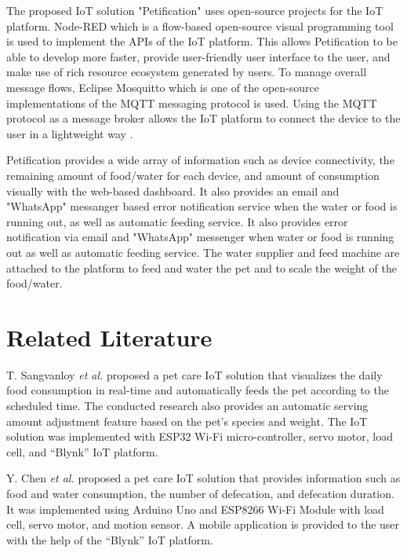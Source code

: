﻿\documentclass[conference]{IEEEtran}
\begin{document}
The proposed IoT solution "Petification" uses open-source projects for the IoT platform.
Node-RED which is a flow-based open-source visual programming tool \cite{b7} is used to implement the APIs of the IoT platform.
This allows Petification to be able to develop more faster, provide user-friendly user interface to the user, and make use of rich resource ecosystem generated by users. 
To manage overall message flows, Eclipse Mosquitto which is one of the open-source implementations of the MQTT messaging protocol is used.
Using the MQTT protocol as a message broker allows the IoT platform to connect the device to the user in a lightweight way \cite{b8}.

Petification provides a wide array of information such as device connectivity, the remaining amount of food/water for each device, and amount of consumption visually with the web-based dashboard.
It also provides an email and "WhatsApp" messanger based error notification service when the water or food is running out, as well as automatic feeding service.
It also provides error notification via email and "WhatsApp" messenger when water or food is running out as well as automatic feeding service.
The water supplier and feed machine are attached to the platform to feed and water the pet and to scale the weight of the food/water.

\section{Related Literature}
T. Sangvanloy \textit{et al.} \cite{b3} proposed a pet care IoT solution that visualizes the daily food consumption in real-time and automatically feeds the pet according to the scheduled time.
The conducted research also provides an automatic serving amount adjustment feature based on the pet's species and weight.
The IoT solution was implemented with ESP32 Wi-Fi micro-controller, servo motor, load cell, and “Blynk” IoT platform.

Y. Chen \textit{et al.} \cite{b4} proposed a pet care IoT solution that provides information such as food and water consumption, the number of defecation, and defecation duration.
It was implemented using Arduino Uno and ESP8266 Wi-Fi Module with load cell, servo motor, and motion sensor.
A mobile application is provided to the user with the help of the “Blynk” IoT platform.
\end{document}
